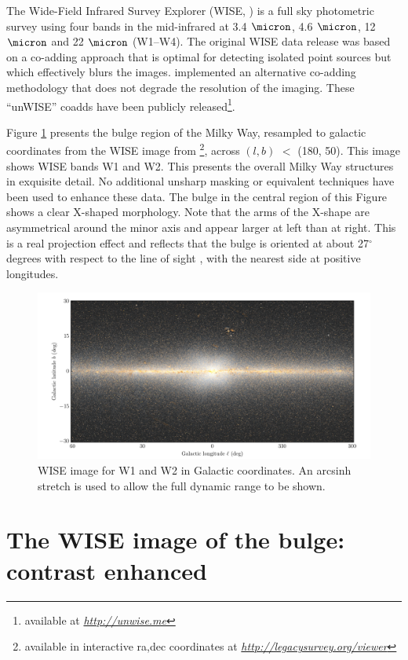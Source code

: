 \documentclass[12pt, preprint]{aastex}
\newcommand{\niceurl}[1]{\href{#1}{\textsl{#1}}}
\newcommand{\viewerurl}{\niceurl{http://legacysurvey.org/viewer}}
\begin{document}
The Wide-Field Infrared Survey Explorer (WISE, \citet{W2010}) is a full sky photometric survey using four bands in the mid-infrared at 3.4 $\micron$, 4.6 $\micron$, 12 $\micron$ and 22 $\micron$ (W1--W4). The original WISE data release was based on a co-adding approach that is optimal for detecting isolated point sources but which effectively blurs the images. \citet{Lang2014b} implemented an alternative co-adding methodology that does not degrade the resolution of the imaging.  These ``unWISE'' coadds have been publicly released\footnote{available at \niceurl{http://unwise.me}}.

Figure \ref{fig:xbulge} presents the bulge region of the Milky Way,  resampled to galactic coordinates from the WISE image from \citet{Lang2014a} \footnote{available in interactive ra,dec coordinates at \viewerurl}, across $(l,b)$ $<$ (180, 50).  This image shows WISE bands W1 and W2. This presents the overall Milky Way structures in exquisite detail.
No additional unsharp masking or equivalent techniques have been used to enhance these data. The bulge in the central region of this Figure shows a clear X-shaped morphology. Note that the arms of the X-shape are asymmetrical around the minor axis and appear larger at left than at right. This is a real projection effect and reflects that the bulge is oriented at about 27$^\circ$ degrees with respect to the line of sight \citep{Wegg2013}, with the nearest side at positive longitudes.

\begin{figure}[h!]
\centering
        \includegraphics[width=\textwidth]{xbulge-00}
\caption{WISE image for W1 and W2 in Galactic coordinates.  An arcsinh
  stretch is used to allow the full dynamic range to be shown.}
\label{fig:xbulge}
\end{figure}

\section{The WISE image of the bulge: contrast enhanced}
\end{document}
